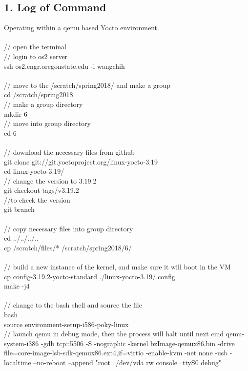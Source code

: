 \documentclass[english,10pt,letterpaper,onecolumn]{IEEEtran}
\begin{document}
\subsection*{\bf 1. Log of Command}
Operating within a qemu based Yocto environment.\\\\
// open the terminal\\
// login to os2 server\\
ssh os2.engr.oregonstate.edu -l wangchih\\\\
// move to the /scratch/spring2018/ and make a group \\
cd /scratch/spring2018\\
// make a group directory\\
mkdir 6\\
// move into group directory\\
cd 6\\\\
// download the necessary files from github\\
git clone git://git.yoctoproject.org/linux-yocto-3.19\\
cd linux-yocto-3.19/\\
// change the version to 3.19.2\\
git checkout tags/v3.19.2\\
//to check the version\\
git branch\\\\
// copy necessary files into group directory\\
cd ../../../..\\
cp /scratch/files/* /scratch/spring2018/6/\\\\
// build a new instance of the kernel, and make sure it will boot in the VM\\
cp config-3.19.2-yocto-standard ./linux-yocto-3.19/.config\\
make -j4\\\\
// change to the bash shell and source the file\\
bash\\
source environment-setup-i586-poky-linux\\
// launch qemu in debug mode, then the process will halt until next cmd 
qemu-system-i386 -gdb tcp::5506 -S -nographic -kernel bzImage-qemux86.bin -drive file=core-image-lsb-sdk-qemux86.ext4,if=virtio -enable-kvm -net none -usb -localtime --no-reboot --append "root=/dev/vda rw console=ttyS0 debug"\\\\
\end{document}
